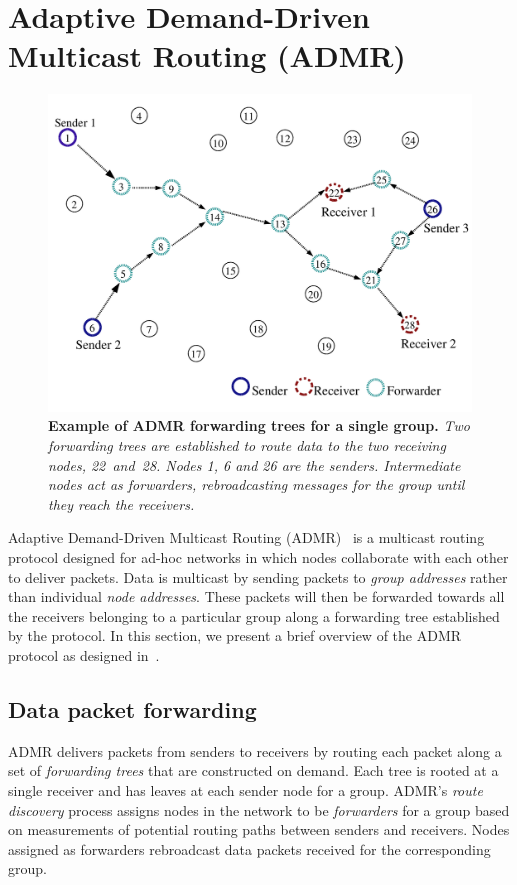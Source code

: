\section{Adaptive Demand-Driven Multicast Routing (ADMR)}
\label{sec-tinyadmr-background}
\label{sec-tinyadmr-admr}

\begin{figure}
\begin{center}
\includegraphics[width=0.6\hsize]{./resources/tinyadmr-techrept05/figures/background/network.pdf}
\end{center}
\caption{{\small {\bf Example of ADMR forwarding trees for a single
group.} {\em Two forwarding trees are established to route data to
the two receiving nodes, 22~and~28. Nodes 1, 6 and 26 are the senders. 
Intermediate nodes act as forwarders, rebroadcasting messages
for the group until they reach the receivers.}}}
\label{fig-network}
\end{figure}

Adaptive Demand-Driven Multicast Routing (ADMR)~\cite{admr} is a
multicast routing protocol designed for ad-hoc networks in which
nodes collaborate with each other to deliver packets. 
Data is multicast by sending packets to {\em group
addresses} rather than individual {\em node addresses}. These packets
will then be forwarded towards all the receivers belonging to a 
particular group along a forwarding tree established by the protocol. 
In this section, we present a brief overview of the ADMR protocol as
designed in~\cite{admr}. 


\subsection{Data packet forwarding}

ADMR delivers packets from senders to receivers by routing each packet
along a set of {\em forwarding trees} that are constructed on demand.
Each tree is rooted at a single receiver and has leaves at each sender
node for a group. ADMR's {\em route discovery} process 
assigns nodes in the network to be {\em forwarders} for a
group based on measurements of potential routing paths 
between senders and receivers. Nodes assigned as forwarders 
rebroadcast data packets received for the corresponding group.


